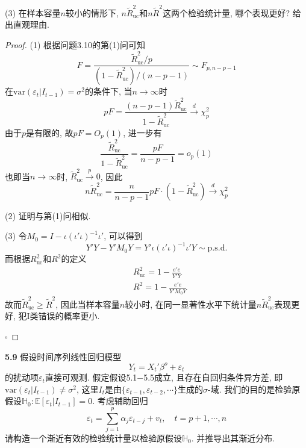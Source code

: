 \documentclass[cn,12pt,math=mtpro2,citestyle=gb7714-2015,bibstyle=gb7714-2015,twocol,mode=simple]{elegantbook}
\newcommand{\E}{\mathbb{E}}
\newcommand{\var}{\text{var}}
\begin{document}
(3) 在样本容量$n$较小的情形下, $n\tilde{R}_{\text{uc}}^2$和$n\tilde{R}^2$这两个检验统计量, 哪个表现更好? 给出直观理由.

\begin{proof}
  (1) 根据问题3.10的第(1)问可知
  $$F=\frac{\tilde{R}^2_{\text{uc}}/p}{(1-\tilde{R}^2_{\text{uc}})/(n-p-1)}\sim F_{p, n-p-1}$$
  在$\var(\varepsilon_t|I_{t-1})=\sigma^2$的条件下, 当$n\rightarrow\infty$时
  $$pF=\frac{(n-p-1)\tilde{R}_{\text{uc}}^2}{1-\tilde{R}_{\text{uc}}^2}\xrightarrow{d}\chi_p^2$$
  由于$p$是有限的, 故$pF=O_p(1)$, 进一步有
  $$\frac{\tilde{R}_{\text{uc}}^2}{1-\tilde{R}_{\text{uc}}^2}=\frac{pF}{n-p-1}=o_p(1)$$
  也即当$n\rightarrow\infty$时, $\tilde{R}_{\text{uc}}^2\xrightarrow{p}0$, 因此
  $$n\tilde{R}_{\text{uc}}^2=\frac{n}{n-p-1}pF\cdot(1-\tilde{R}_{\text{uc}}^2)\xrightarrow{d}\chi^2_p$$

  (2) 证明与第(1)问相似.

  (3) 令$M_0=I-\iota(\iota'\iota)^{-1}\iota'$, 可以得到
  $$Y'Y-Y'M_0Y=Y'\iota(\iota'\iota)^{-1}\iota'Y\sim \text{p.s.d.}$$
  而根据$R_{\text{uc}}^2$和$R^2$的定义
  \begin{align*}
  &R_{\text{uc}}^2=1-\frac{e'e}{Y'Y}\\
  &R^2=1-\frac{e'e}{Y'M_0Y}
  \end{align*}
  故而$\tilde{R}^2_{\text{uc}}\geq\tilde{R}^2$, 因此当样本容量$n$较小时, 在同一显著性水平下统计量$n\tilde{R}_{\text{uc}}^2$表现更好, 犯I类错误的概率更小.

  $\square$
\end{proof}

\textbf{5.9} 假设时间序列线性回归模型
$$Y_t=X_t'\beta^o+\varepsilon_t$$
的扰动项$\varepsilon_t$直接可观测. 假定假设5.1$-$5.5成立, 且存在自回归条件异方差, 即$\var(\varepsilon_t|I_{t-1})\neq\sigma^2$, 这里$I_t$是由$\{\varepsilon_{t-1}, \varepsilon_{t-2},\cdots\}$生成的$\sigma$-域. 我们的目的是检验原假设$\mathbb{H}_0: \E[\varepsilon_t|I_{t-1}]=0$. 考虑辅助回归
$$\varepsilon_t=\sum_{j=1}^{p}\alpha_j\varepsilon_{t-j}+v_t,\quad t=p+1,\cdots,n$$
请构造一个渐近有效的检验统计量以检验原假设$\mathbb{H}_0$. 并推导出其渐近分布.
\end{document}

